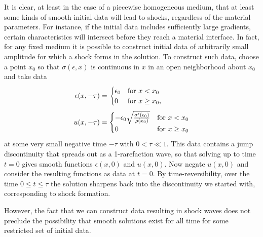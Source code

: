 It is clear, at least in the case of a piecewise homogeneous medium, 
that at least some kinds of smooth initial data will lead to shocks,
regardless of the material parameters.  For instance,
if the initial data includes sufficiently large gradients, certain
characteristics will intersect before they reach a material interface.
In fact, for any fixed medium it is possible to construct initial data of
arbitrarily small amplitude for which a shock forms in the solution.  To
construct such data, choose a point $x_0$ so that $\sigma(\epsilon,x)$ is
continuous in $x$ in an open neighborhood about $x_0$ and take data
\begin{subequations} \label{ic1}
\begin{align}
\epsilon(x,-\tau) &= \begin{cases} \epsilon_0 &\text{for}~ x<x_0\\
0 &\text{for}~ x\geq x_0, \end{cases}\\
\noalign{\vskip 3pt}
u(x,-\tau) &= \begin{cases} -\epsilon_0\sqrt{\frac{\sigma'(\epsilon_0)}{\rho(x_0)}}
 &\text{for}~ x<x_0\\
0 &\text{for}~ x\geq x_0 \end{cases}
\end{align}
\end{subequations}
at some very small negative time $-\tau$ with $0<\tau\ll 1$.
This data contains a jump discontinuity that spreads out as a 1-rarefaction
wave, so that solving up to time $t=0$ gives smooth functions
$\epsilon(x,0)$ and $u(x,0)$.  Now negate $u(x,0)$ and consider the
resulting functions as data at $t=0$.  By time-reversibility, over the time
$0\leq t\leq \tau$ the solution sharpens back into the discontinuity we
started with, corresponding to shock formation.

However, the fact that we can construct data resulting in shock waves 
does not preclude the possibility that smooth solutions
exist for all time for some restricted set of initial data.





